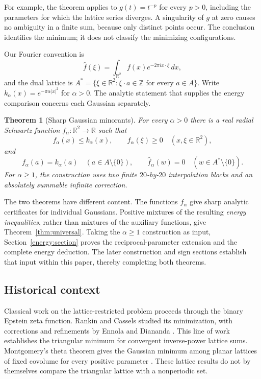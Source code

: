\documentclass[11pt]{article}
\newtheorem{theorem}{Theorem}[section]
\theoremstyle{remark}\newtheorem{remark}[theorem]{Remark}
\begin{document}
For example, the theorem applies to $g(t)=t^{-p}$ for every $p>0$, including
the parameters for which the lattice series diverges. A singularity of $g$
at zero causes no ambiguity in a finite sum, because only distinct points
occur. The conclusion identifies the minimum; it does not classify the
minimizing configurations.

Our Fourier convention is
\[
 \widehat f(\xi)=\int_{\mathbb R^2}f(x)e^{-2\pi i x\cdot\xi}\,dx,
\]
and the dual lattice is
$A^*=\{\xi\in\mathbb R^2:\xi\cdot a\in\mathbb Z\text{ for every }a\in A\}$.
Write $k_\alpha(x)=e^{-\pi\alpha|x|^2}$ for $\alpha>0$.
The analytic statement that supplies the energy comparison concerns each
Gaussian separately.

\begin{theorem}[Sharp Gaussian minorants]\label{thm:gaussian}
For every $\alpha>0$ there is a real radial Schwartz function
$f_\alpha:\mathbb R^2\to\mathbb R$ such that
\[
 f_\alpha(x)\le k_\alpha(x),\qquad
 \widehat f_\alpha(\xi)\ge0
 \quad(x,\xi\in\mathbb R^2),
\]
and
\[
 f_\alpha(a)=k_\alpha(a)\quad(a\in A\setminus\{0\}),\qquad
 \widehat f_\alpha(w)=0\quad(w\in A^*\setminus\{0\}).
\]
For $\alpha\ge1$, the construction uses two finite $20$-by-$20$ interpolation
blocks and an absolutely summable infinite correction.
\end{theorem}

The two theorems have different content. The functions $f_\alpha$ give
sharp analytic certificates for individual Gaussians. Positive mixtures
of the resulting \emph{energy inequalities}, rather than mixtures of the
auxiliary functions, give Theorem~\ref{thm:universal}. Taking the
$\alpha\ge1$ construction as input, Section~\ref{energy:section} proves
the reciprocal-parameter extension and the complete energy deduction.
The later construction and sign sections establish that input within this
paper, thereby completing both theorems.

\subsection{Historical context}

Classical work on the lattice-restricted problem proceeds through the
binary Epstein zeta function. Rankin and Cassels studied its minimization,
with corrections and refinements by Ennola and Diananda
\cite{Rankin1953,Cassels1959,Cassels1963Corrigendum,Ennola1964Lemma,Diananda1964}.
This line of work establishes the triangular minimum for convergent
inverse-power lattice sums. Montgomery's theta theorem gives the Gaussian
minimum among planar lattices of fixed covolume for every positive parameter
\cite[Theorem~1]{Montgomery1988}. These lattice results do not by themselves
compare the triangular lattice with a nonperiodic set.
\end{document}
